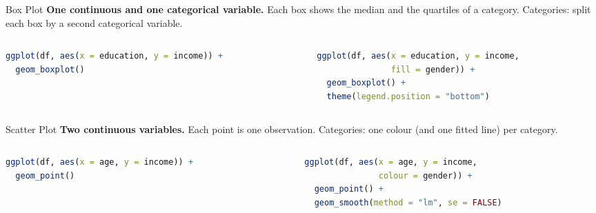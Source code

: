 \documentclass[9pt,aspectratio=169]{beamer}
\begin{document}
\begin{frame}[fragile]{Box Plot}
\linespread{1.3}\selectfont
\textbf{One continuous and one categorical variable.} Each box shows the median and the quartiles of a category. Categories: split each box by a second categorical variable.

\begin{columns}[t]
\begin{column}{0.5\textwidth}
\centering
{}
\begin{lstlisting}[language=R, basicstyle=\ttfamily\scriptsize]
ggplot(df, aes(x = education, y = income)) +
  geom_boxplot()
\end{lstlisting}
\end{column}
\begin{column}{0.5\textwidth}
\centering
{}
\begin{lstlisting}[language=R, basicstyle=\ttfamily\scriptsize]
ggplot(df, aes(x = education, y = income,
               fill = gender)) +
  geom_boxplot() +
  theme(legend.position = "bottom")
\end{lstlisting}
\end{column}
\end{columns}
\end{frame}


\begin{frame}[fragile]{Scatter Plot}
\linespread{1.3}\selectfont
\textbf{Two continuous variables.} Each point is one observation. Categories: one colour (and one fitted line) per category.

\begin{columns}[t]
\begin{column}{0.5\textwidth}
\centering
{}
\begin{lstlisting}[language=R, basicstyle=\ttfamily\scriptsize]
ggplot(df, aes(x = age, y = income)) +
  geom_point()
\end{lstlisting}
\end{column}
\begin{column}{0.5\textwidth}
\centering
{}
\begin{lstlisting}[language=R, basicstyle=\ttfamily\scriptsize]
ggplot(df, aes(x = age, y = income,
               colour = gender)) +
  geom_point() +
  geom_smooth(method = "lm", se = FALSE)
\end{lstlisting}
\end{column}
\end{columns}
\end{frame}
\end{document}
